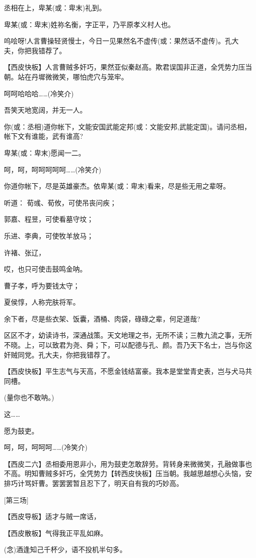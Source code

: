 丞相在上，卑某(或：卑末)礼到。

卑某(或：卑末)姓祢名衡，字正平，乃平原孝义村人也。

呜哙呀!人言曹操轻贤慢士，今日一见果然名不虚传(或：果然话不虚传)。孔大夫，你把我错荐了。

【西皮快板】人言曹贼多奸巧，果然亚似秦赵高。欺君误国非正道，全凭势力压当朝。站在丹墀微微笑，哪怕虎穴与笼牢。

呵呵哈哈哈\ldots{}\ldots{}(冷笑介)

吾笑天地宽阔，并无一人。

你(或：丞相)道你帐下，文能安国武能定邦(或：文能安邦,武能定国)。请问丞相，帐下文有谁能，武有谁高?

卑某(或：卑末)愿闻一二。

呵，呵，呵呵呵呵呵\ldots{}\ldots{}(冷笑介)

你道你帐下，尽是英雄豪杰。依卑某(或：卑末)看来，尽是些无用之辈呀。

听道： 荀彧、荀攸，可使吊丧问疾；

郭嘉、程昱，可使看墓守坟；

乐进、李典，可使牧羊放马；

许褚、张辽，

哎，也只可使击鼓鸣金呐。

曹子孝，呼为要钱太守；

夏侯惇，人称完肤将军。

余下者，尽是些衣架、饭囊，酒桶、肉袋，碌碌之辈，何足道哉?

区区不才，幼读诗书，深通战策。天文地理之书，无所不读；三教九流之事，无所不晓。上，可以致君为尧、舜；下，可以配德与孔、颜。吾乃天下名士，岂与你这奸贼同党。孔大夫，你把我错荐了。

【西皮快板】平生志气与天高，不愿金钱结富豪。我本是堂堂青史表，岂与犬马共同槽。

(量你也不敢呐。)

这\ldots{}\ldots{}

愿为鼓吏。

呵，呵，呵呵呵\ldots{}\ldots{}(冷笑介)

【西皮二六】丞相委用恩非小，用为鼓吏怎敢辞劳。背转身来微微笑，孔融做事也不高。明知曹贼多奸巧，全凭势力【转西皮快板】压当朝。我越思越想心头恼，安排巧计骂奸曹。罢罢罢暂且忍下了，明天自有我的巧妙高。

{[}第三场{]}

【西皮导板】适才与贼一席话，

【西皮散板】气得我正平乱如麻。

(念)酒逢知己千杯少，语不投机半句多。

